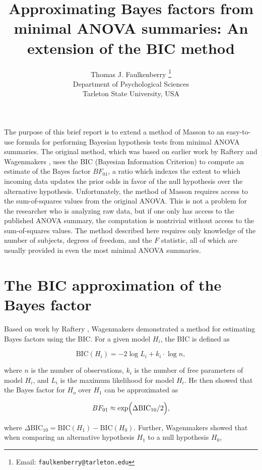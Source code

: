 \documentclass[]{article}
\title{Approximating Bayes factors from minimal ANOVA summaries: An extension of the BIC method}
\author{Thomas J. Faulkenberry \thanks{Email: \texttt{faulkenberry@tarleton.edu}}\\
  Department of Psychological Sciences\\
  Tarleton State University, USA
}
\begin{document}
\maketitle


The purpose of this brief report is to extend a method of Masson \cite{masson2011} to an easy-to-use formula for performing Bayesian hypothesis tests from minimal ANOVA summaries.  The original method, which was based on earlier work by Raftery \cite{raftery1995} and Wagenmakers \cite{wagenmakers2007}, uses the BIC (Bayesian Information Criterion) to compute an estimate of the Bayes factor $BF_{01}$, a ratio which indexes the extent to which incoming data updates the prior odds in favor of the null hypothesis over the alternative hypothesis.  Unfortunately, the method of Masson \cite{masson2011} requires access to the sum-of-squares values from the original ANOVA.  This is not a problem for the researcher who is analyzing raw data, but if one only has access to the published ANOVA summary, the computation is nontrivial without access to the sum-of-squares values.  The method described here requires only knowledge of the number of subjects, degrees of freedom, and the $F$ statistic, all of which are usually provided in even the most minimal ANOVA summaries.

\section{The BIC approximation of the Bayes factor}

Based on work by Raftery \cite{raftery1995}, Wagenmakers \cite{wagenmakers2007} demonstrated a method for estimating Bayes factors using the BIC. For a given model $H_i$, the BIC is defined as

\[
  \text{BIC}(H_i) = -2\log L_i + k_i\cdot \log n,
\]

\noindent
where $n$ is the number of observations, $k_i$ is the number of free parameters
of model $H_i$, and $L_i$ is the maximum likelihood for model $H_i$.  He then showed that the Bayes factor for $H_o$ over $H_1$ can be approximated as

\begin{equation}
  \label{eq:BF}
  BF_{01} \approx \exp\Bigl(\Delta\text{BIC}_{10}/2\Bigl),
\end{equation}

\noindent
where $\Delta\text{BIC}_{10} = \text{BIC}(H_1)-\text{BIC}(H_0)$.  Further, Wagenmakers \cite{wagenmakers2007} showed that when comparing an alternative hypothesis $H_1$ to a null hypothesis $H_0$, 
\end{document}
